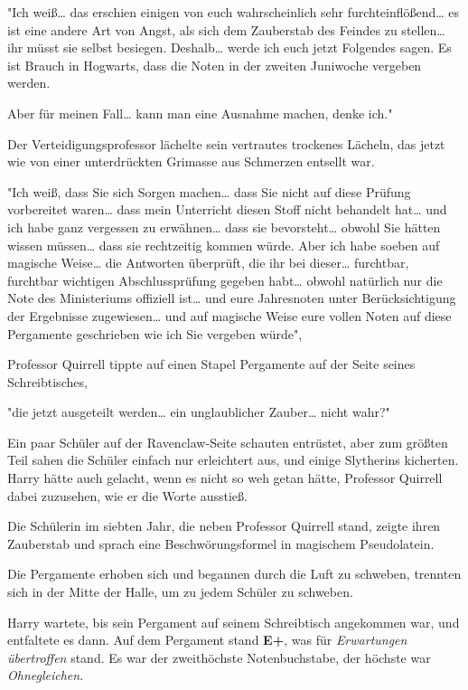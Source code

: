 {"Ich weiß… das erschien einigen von euch wahrscheinlich sehr furchteinflößend… es ist eine andere Art von Angst, als sich dem Zauberstab des Feindes zu stellen… ihr müsst sie selbst besiegen. Deshalb… werde ich euch jetzt Folgendes sagen. Es ist Brauch in Hogwarts, dass die Noten in der zweiten Juniwoche vergeben werden.

Aber für meinen Fall… kann man eine Ausnahme machen, denke ich."

Der Verteidigungsprofessor lächelte sein vertrautes trockenes Lächeln, das jetzt wie von einer unterdrückten Grimasse aus Schmerzen entsellt war.

"Ich weiß, dass Sie sich Sorgen machen… dass Sie nicht auf diese Prüfung vorbereitet waren… dass mein Unterricht diesen Stoff nicht behandelt hat… und ich habe ganz vergessen zu erwähnen… dass sie bevorsteht… obwohl Sie hätten wissen müssen… dass sie rechtzeitig kommen würde. Aber ich habe soeben auf magische Weise… die Antworten überprüft, die ihr bei dieser… furchtbar, furchtbar wichtigen Abschlussprüfung gegeben habt… obwohl natürlich nur die Note des Ministeriums offiziell ist… und eure Jahresnoten unter Berücksichtigung der Ergebnisse zugewiesen… und auf magische Weise eure vollen Noten auf diese Pergamente geschrieben wie ich Sie vergeben würde",

Professor Quirrell tippte auf einen Stapel Pergamente auf der Seite seines Schreibtisches,

"die jetzt ausgeteilt werden… ein unglaublicher Zauber… nicht wahr?"

Ein paar Schüler auf der Ravenclaw-Seite schauten entrüstet, aber zum größten Teil sahen die Schüler einfach nur erleichtert aus, und einige Slytherins kicherten. Harry hätte auch gelacht, wenn es nicht so weh getan hätte, Professor Quirrell dabei zuzusehen, wie er die Worte ausstieß.

Die Schülerin im siebten Jahr, die neben Professor Quirrell stand, zeigte ihren Zauberstab und sprach eine Beschwörungsformel in magischem Pseudolatein.

Die Pergamente erhoben sich und begannen durch die Luft zu schweben, trennten sich in der Mitte der Halle, um zu jedem Schüler zu schweben.

Harry wartete, bis sein Pergament auf seinem Schreibtisch angekommen war, und entfaltete es dann. Auf dem Pergament stand \textbf{E+}, was für \emph{Erwartungen übertroffen} stand. Es war der zweithöchste Notenbuchstabe, der höchste war \emph{Ohnegleichen}.

}
